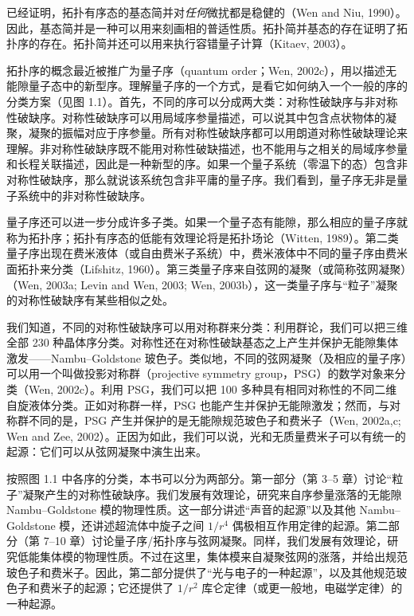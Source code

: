 已经证明，拓扑有序态的基态简并对\emph{任何}微扰都是稳健的（Wen and Niu, 1990）。因此，基态简并是一种可以用来刻画相的普适性质。拓扑简并基态的存在证明了拓扑序的存在。拓扑简并还可以用来执行容错量子计算（Kitaev, 2003）。

拓扑序的概念最近被推广为量子序（quantum order；Wen, 2002c），用以描述无能隙量子态中的新型序。理解量子序的一个方式，是看它如何纳入一个一般的序的分类方案（见图 1.1）。首先，不同的序可以分成两大类：对称性破缺序与非对称性破缺序。对称性破缺序可以用局域序参量描述，可以说其中包含点状物体的凝聚，凝聚的振幅对应于序参量。所有对称性破缺序都可以用朗道对称性破缺理论来理解。非对称性破缺序既不能用对称性破缺描述，也不能用与之相关的局域序参量和长程关联描述，因此是一种新型的序。如果一个量子系统（零温下的态）包含非对称性破缺序，那么就说该系统包含非平庸的量子序。我们看到，量子序无非是量子系统中的非对称性破缺序。

量子序还可以进一步分成许多子类。如果一个量子态有能隙，那么相应的量子序就称为拓扑序；拓扑有序态的低能有效理论将是拓扑场论（Witten, 1989）。第二类量子序出现在费米液体（或自由费米子系统）中，费米液体中不同的量子序由费米面拓扑来分类（Lifshitz, 1960）。第三类量子序来自弦网的凝聚（或简称弦网凝聚）（Wen, 2003a; Levin and Wen, 2003; Wen, 2003b），这一类量子序与“粒子”凝聚的对称性破缺序有某些相似之处。

我们知道，不同的对称性破缺序可以用对称群来分类：利用群论，我们可以把三维全部 230 种晶体序分类。对称性还在对称性破缺基态之上产生并保护无能隙集体激发——Nambu–Goldstone 玻色子。类似地，不同的弦网凝聚（及相应的量子序）可以用一个叫做投影对称群（projective symmetry group，PSG）的数学对象来分类（Wen, 2002c）。利用 PSG，我们可以把 100 多种具有相同对称性的不同二维自旋液体分类。正如对称群一样，PSG 也能产生并保护无能隙激发；然而，与对称群不同的是，PSG 产生并保护的是无能隙规范玻色子和费米子（Wen, 2002a,c; Wen and Zee, 2002）。正因为如此，我们可以说，光和无质量费米子可以有统一的起源：它们可以从弦网凝聚中演生出来。

按照图 1.1 中各序的分类，本书可以分为两部分。第一部分（第 3–5 章）讨论“粒子”凝聚产生的对称性破缺序。我们发展有效理论，研究来自序参量涨落的无能隙 Nambu–Goldstone 模的物理性质。这一部分讲述“声音的起源”以及其他 Nambu–Goldstone 模，还讲述超流体中旋子之间 $1/r^4$ 偶极相互作用定律的起源。第二部分（第 7–10 章）讨论量子序/拓扑序与弦网凝聚。同样，我们发展有效理论，研究低能集体模的物理性质。不过在这里，集体模来自凝聚弦网的涨落，并给出规范玻色子和费米子。因此，第二部分提供了“光与电子的一种起源”，以及其他规范玻色子和费米子的起源；它还提供了 $1/r^2$ 库仑定律（或更一般地，电磁学定律）的一种起源。

